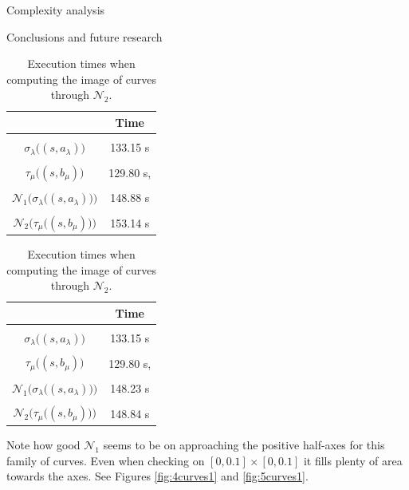 \documentclass[11pt, a4paper, english, twoside, notitlepage, openright]{report}
\begin{document}
\begin{chapter}{Complexity analysis}
\begin{section}{Conclusions and future research}
\begin{table}[ht!]
\parbox{.45\linewidth}{
\centering
\begin{tabular}{c || c }
 & Time  \\ \hline \hline
\\[-1em]
$\sigma_{\lambda}\big((s, a_\lambda)\big)$ &  133.15 s\\ \hline
\\[-1em]
$\tau_{\mu}\big((s, b_\mu)\big)$ &129.80 s, \\ \hline
\\[-1em]
$\mathcal{N}_1\big(\sigma_{\lambda}\big((s, a_\lambda)\big)\big)$ & 148.88 s \\ \hline
\\[-1em]
$\mathcal{N}_2\big(\tau_{\mu}\big((s, b_\mu)\big)\big)$ & 153.14 s \\
\end{tabular}
\caption[]{Execution times when computing the image of curves through $\mathcal{N}_1$.}\label{tab:curvesNew1}
}
\hfill
\parbox{.45\linewidth}{
\centering
\begin{tabular}{c || c }
 & Time  \\ \hline \hline
\\[-1em]
$\sigma_{\lambda}\big((s, a_\lambda)\big)$ &  133.15 s\\ \hline
\\[-1em]
$\tau_{\mu}\big((s, b_\mu)\big)$ &129.80 s, \\ \hline
\\[-1em]
$\mathcal{N}_1\big(\sigma_{\lambda}\big((s, a_\lambda)\big)\big)$ & 148.23 s  \\ \hline
\\[-1em]
$\mathcal{N}_2\big(\tau_{\mu}\big((s, b_\mu)\big)\big)$ & 148.84 s \\
\end{tabular}
\caption[]{Execution times when computing the image of curves through $\mathcal{N}_2$.}\label{tab:curvesNew2}
}
\end{table}

Note how good $\mathcal{N}_1$ seems to be on approaching the positive half-axes for this family of curves. Even when checking on $[0, 0.1]\times[0, 0.1]$ it fills plenty of area towards the axes. See Figures \ref{fig:4curves1} and \ref{fig:5curves1}.


\end{section}
\end{chapter}
\end{document}
